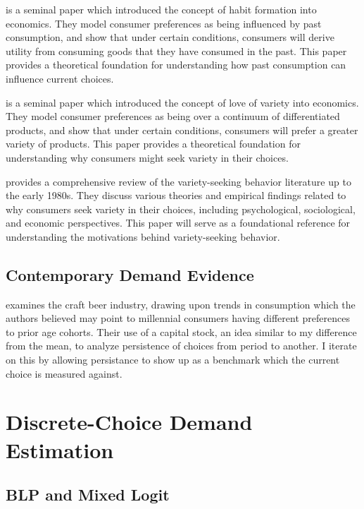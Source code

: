 \documentclass[12pt]{article}
\begin{document}
\cite{pollak1970habit} is a seminal paper which introduced the concept of habit formation into economics. They model consumer preferences as being influenced by past consumption, and show that under certain conditions, consumers will derive utility from consuming goods that they have consumed in the past. This paper provides a theoretical foundation for understanding how past consumption can influence current choices.

\cite{dixit1977monopolistic} is a seminal paper which introduced the concept of love of variety into economics. They model consumer preferences as being over a continuum of differentiated products, and show that under certain conditions, consumers will prefer a greater variety of products. This paper provides a theoretical foundation for understanding why consumers might seek variety in their choices.

\cite{mcallister1982variety} provides a comprehensive review of the variety-seeking behavior literature up to the early 1980s. They discuss various theories and empirical findings related to why consumers seek variety in their choices, including psychological, sociological, and economic perspectives. This paper will serve as a foundational reference for understanding the motivations behind variety-seeking behavior.

\subsection{Contemporary Demand Evidence}

\cite{bronnenberg2012brand} examines the craft beer industry, drawing upon trends in consumption which the authors believed may point to millennial consumers having different preferences to prior age cohorts. Their use of a capital stock, an idea similar to my difference from the mean, to analyze persistence of choices from period to another. I iterate on this by allowing persistance to show up as a benchmark which the current choice is measured against.


\section{Discrete-Choice Demand Estimation}

\subsection{BLP and Mixed Logit}
\end{document}
